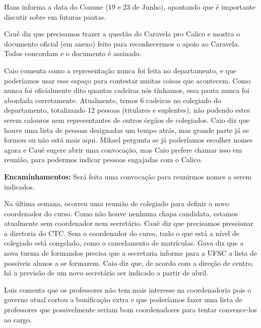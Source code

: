 \documentclass{ata-calico}
\begin{document}
\maketitle

Hans informa a data do Conune (19 e 23 de Junho), apontando que é importante discutir sobre em futuras pautas.

Cauê diz que precisamos trazer a questão do Caravela pro Calico e mostra o documento oficial (em anexo) feito para reconhecermos o apoio ao Caravela. Todos concordam e o documento é assinado.


Caio comenta como a representação nunca foi feita no departamento, e que poderíamos usar esse espaço para contestar muitas coisas que acontecem. Como nunca foi oficialmente dito quantas cadeiras nós tínhamos, essa pauta nunca foi abordada corretamente. Atualmente, temos 6 cadeiras no colegiado do departamento, totalizando 12 pessoas (titulares e suplentes), não podendo estes serem calouros nem representantes de outros órgãos de colegiados. Caio diz que houve uma lista de pessoas designadas um tempo atrás, mas grande parte já se formou ou não está mais aqui. Mikael pergunta se já poderíamos escolher nomes agora e Cauê sugere abrir uma convocação, mas Caio prefere chamar isso em reunião, para podermos indicar pessoas engajadas com o Calico.\newline

\textbf{Encaminhamentos:} Será feita uma convocação para reunirmos nomes a serem indicados.

Na última semana, ocorreu uma reunião de colegiado para definir o novo coordenador do curso. Como não houve nenhuma chapa candidata, estamos atualmente sem coordenador nem secretário. Cauê diz que precisamos pressionar a diretoria do CTC. Sem o coordenador do curso, tudo o que está a nível de colegiado está congelado, como o cancelamento de matrículas. Gava diz que a nova turma de formandos precisa que a secretaria informe para a UFSC a lista de possíveis alunos a se formarem. Caio diz que, de acordo com a direção de centro, há a previsão de um novo secretário ser indicado a partir de abril.

Luis comenta que os professores não tem mais interesse na coordenadoria pois o governo atual cortou a bonificação extra e que poderíamos fazer uma lista de professores que possivelmente seriam bom coordenadores para tentar convence-los ao cargo.
\end{document}
